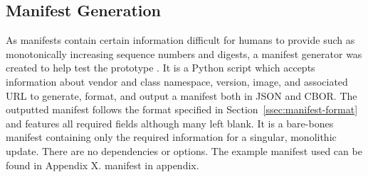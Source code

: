 \documentclass[0-thesis.tex]{subfiles}
\begin{document}
\subsection{Manifest Generation}
\label{ssec:manifest-generation}
As manifests contain certain information difficult for humans to provide such as
monotonically increasing sequence numbers and digests, a manifest generator was created to
help test the prototype \parencite{manifest-generator}. It is a Python script which
accepts information about vendor and class namespace, version, image, and associated URL
to generate, format, and output a manifest both in JSON and CBOR. The outputted manifest
follows the format specified in Section~\ref{ssec:manifest-format} and features all
required fields although many left blank. It is a bare-bones manifest containing only the
required information for a singular, monolithic update. There are no dependencies or
options. The example manifest used can be found in Appendix X. %
manifest in appendix.
\end{document}
